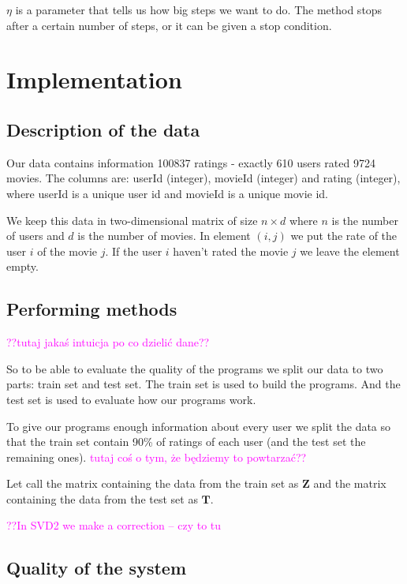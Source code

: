 \documentclass[11pt]{amsart}
\newcommand{\tami}[1]{{\textcolor{magenta}{#1}}}
\begin{document}
$\eta$ is a parameter that tells us how big steps we want to do.
The method stops after a certain number of steps, or it can be given a stop condition.

\section{Implementation}

\subsection*{Description of the data}

Our data contains information 100837 ratings - exactly 610 users rated 9724 movies.
The columns are: \textsf{userId} (integer), \textsf{movieId} (integer) and \textsf{rating} (integer), where \textsf{userId} is a unique user id and \textsf{movieId} is a unique movie id.


We keep this data in two-dimensional matrix of size $n \times d$ where $n$ is the number of users and $d$ is the number of movies.
In element $(i,j)$ we put the rate of the user $i$ of the movie $j$.
If the user $i$ haven't rated the movie $j$ we leave the element empty.


\subsection*{Performing methods}

\tami{??tutaj jakaś intuicja po co dzielić dane??}

So to be able to evaluate the quality of the programs we split our data to two parts: train set and test set.
The train set is used to build the programs.
And the test set is used to evaluate how our programs work.


To give our programs enough information about every user we split the data so that the train set contain 90\% of ratings of each user (and the test set the remaining ones).
\tami{tutaj coś o tym, że będziemy to powtarzać??}

Let call the matrix containing the data from the train set as $\boldsymbol{Z}$ and the matrix containing the data from the test set as $\boldsymbol{T}$.

\tami{??In SVD2 we make a correction -- czy to tu}

\subsection*{Quality of the system}
\end{document}
